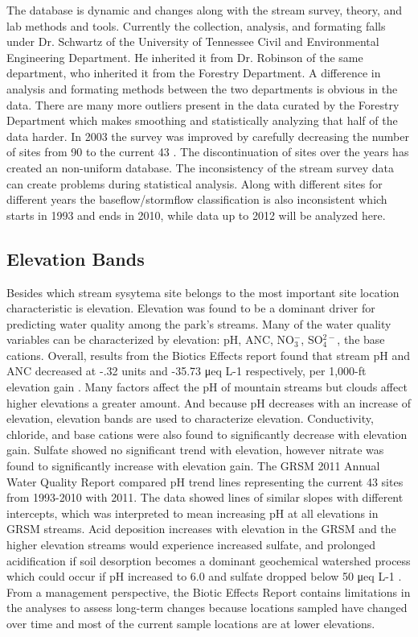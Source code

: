 The database is dynamic and changes along with the stream survey, theory,  and lab methods and tools.
Currently the collection, analysis, and formating falls under Dr. Schwartz of the University of Tennessee Civil and Environmental Engineering Department.
He inherited it from Dr. Robinson of the same department, who inherited it from the Forestry Department.
A difference in analysis and formating methods between the two departments is obvious in the data.
There are many more outliers present in the data curated by the Forestry Department which makes smoothing and statistically analyzing that half of the data harder.
In 2003 the survey was improved by carefully decreasing the number of  sites from 90 to the current 43 \citep{odom2003}.
The discontinuation of sites over the years has created an non-uniform database.
The inconsistency of the stream survey data can create problems during statistical analysis.
Along with different sites for different years the baseflow/stormflow classification is also inconsistent which starts in 1993 and ends in 2010, while data up to 2012 will be analyzed here.

\subsection{Elevation Bands}

Besides which stream sysytema site belongs to the most important site location characteristic is elevation.
Elevation was found to be a dominant driver for predicting water quality among the park's streams. 
Many of the water quality variables can be characterized by elevation: pH, ANC, NO$_3^-$, SO$_4^{2-}$, the base cations.
Overall, results from the Biotics Effects report found that stream pH and ANC decreased at -.32 units and -35.73 μeq L-1 respectively, per 1,000-ft elevation gain \citep{cai2013}. 
Many factors affect the pH of mountain streams but clouds affect higher elevations a greater amount.
And because pH decreases with an increase of elevation, elevation bands are used to characterize elevation.
Conductivity, chloride, and base cations were also found to significantly decrease with elevation gain.  
Sulfate showed no significant trend with elevation, however nitrate was found to significantly increase with elevation gain.  
The GRSM 2011 Annual Water Quality Report compared pH trend lines representing the current 43 sites from 1993-2010 with 2011.  
The data showed lines of similar slopes with different intercepts, which was interpreted to mean increasing pH at all elevations in GRSM streams.  
Acid deposition increases with elevation in the GRSM and the higher elevation streams would experience increased sulfate, and prolonged acidification if soil desorption becomes a dominant geochemical watershed process which could occur if pH increased to 6.0 and sulfate dropped below 50 μeq L-1 \citep{annualreport2012}.  
From a management perspective, the Biotic Effects Report contains limitations in the analyses to assess long-term changes because locations sampled have changed over time and most of the current sample locations are at lower elevations.

